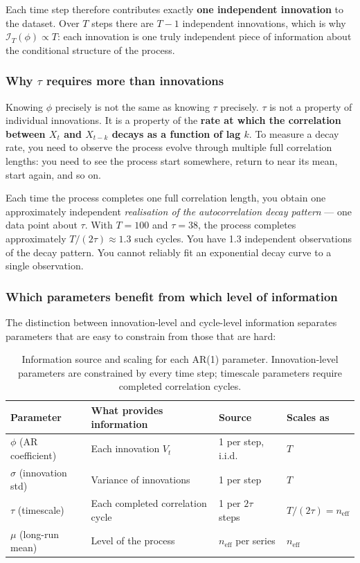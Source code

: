 \documentclass[11pt, a4paper]{article}
\begin{document}
Each time step therefore contributes exactly \textbf{one independent innovation}
to the dataset.
Over $T$ steps there are $T-1$ independent innovations, which is why
$\mathcal{I}_T(\phi) \propto T$: each innovation is one truly independent piece of
information about the conditional structure of the process.

\subsubsection*{Why $\tau$ requires more than innovations}

Knowing $\phi$ precisely is not the same as knowing $\tau$ precisely.
$\tau$ is not a property of individual innovations.
It is a property of the \textbf{rate at which the correlation between $X_t$ and
$X_{t-k}$ decays as a function of lag $k$}.
To measure a decay rate, you need to observe the process evolve through multiple
full correlation lengths: you need to see the process start somewhere, return to near
its mean, start again, and so on.

Each time the process completes one full correlation length, you obtain one
approximately independent \emph{realisation of the autocorrelation decay pattern} ---
one data point about $\tau$.
With $T = 100$ and $\tau = 38$, the process completes approximately $T/(2\tau)
\approx 1.3$ such cycles.
You have 1.3 independent observations of the decay pattern.
You cannot reliably fit an exponential decay curve to a single observation.

\subsubsection*{Which parameters benefit from which level of information}

The distinction between innovation-level and cycle-level information separates
parameters that are easy to constrain from those that are hard:

\begin{table}[h!]
\centering
\caption{Information source and scaling for each AR(1) parameter.
         Innovation-level parameters are constrained by every time step;
         timescale parameters require completed correlation cycles.}
\label{tab:info_levels}
\begin{tabular}{llll}
\toprule
Parameter & What provides information & Source & Scales as \\
\midrule
$\phi$ (AR coefficient) & Each innovation $V_t$ & 1 per step, i.i.d. & $T$ \\
$\sigma$ (innovation std) & Variance of innovations & 1 per step & $T$ \\
$\tau$ (timescale) & Each completed correlation cycle & 1 per $2\tau$ steps & $T/(2\tau) = n_\mathrm{eff}$ \\
$\mu$ (long-run mean) & Level of the process & $n_\mathrm{eff}$ per series & $n_\mathrm{eff}$ \\
\bottomrule
\end{tabular}
\end{table}
\end{document}
